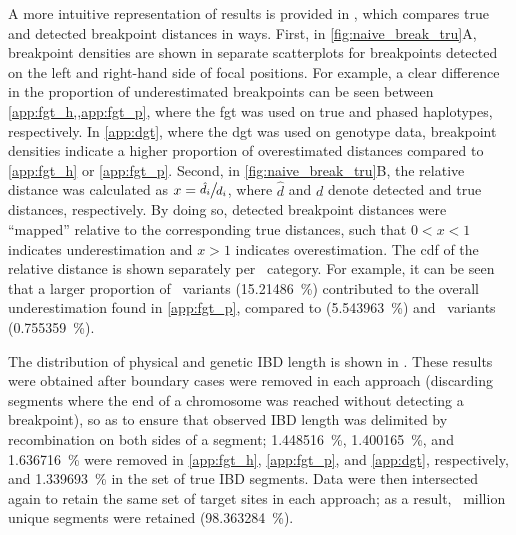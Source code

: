 A more intuitive representation of results is provided in , which compares true and detected breakpoint distances in  ways.
First, in \cref{fig:naive_break_tru}{A}, breakpoint densities are shown in separate scatterplots for breakpoints detected on the left and right-hand side of focal positions.
For example, a clear difference in the proportion of underestimated breakpoints can be seen between \cref{app:fgt_h,,app:fgt_p}, \ie where the \gls{fgt} was used on true and phased haplotypes, respectively.
In \cref{app:dgt}, where the \gls{dgt} was used on genotype data, breakpoint densities indicate a higher proportion of overestimated distances compared to \ref{app:fgt_h} or \ref{app:fgt_p}.
Second, in \cref{fig:naive_break_tru}{B}, the relative distance was calculated as ${x=\large \sfrac{\hat{d}_i}{d_i}}$, where $\hat{d}$ and $d$ denote detected and true distances, respectively.
By doing so, detected breakpoint distances were ``mapped'' relative to the corresponding true distances, such that ${0<x<1}$ indicates underestimation and ${x>1}$ indicates overestimation.
The \gls{cdf} of the relative distance is shown separately per \fk{}~category.
For example, it can be seen that a larger proportion of ~variants (\SI{15.21486}{\percent}) contributed to the overall underestimation found in \cref{app:fgt_p}, \eg compared to  (\SI{5.543963}{\percent}) and ~variants (\SI{0.755359}{\percent}).


%

%

The distribution of physical and genetic IBD length is shown in .
These results were obtained after boundary cases were removed in each approach (\ie discarding segments where the end of a chromosome was reached without detecting a breakpoint), so as to ensure that observed IBD length was delimited by recombination on both sides of a segment; \SI{1.448516}{\percent}, \SI{1.400165}{\percent}, and \SI{1.636716}{\percent}
were removed in \ref{app:fgt_h}, \ref{app:fgt_p}, and \ref{app:dgt}, respectively, and \SI{1.339693}{\percent} in the set of true IBD segments.
Data were then intersected again to retain the same set of target sites in each approach; as a result, ~million unique segments were retained (\SI{98.363284}{\percent}).

